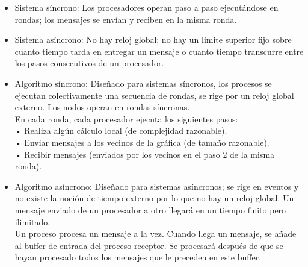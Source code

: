 \documentclass[12pt]{article}
\begin{document}
\begin{itemize}
    \item Sistema síncrono: Los procesadores operan paso a paso ejecutándose en rondas; los mensajes se envían y reciben en la misma ronda.
    \item Sistema asíncrono: No hay reloj global; no hay un limite superior fijo sobre cuanto tiempo tarda en entregar un mensaje o cuanto tiempo transcurre entre los pasos consecutivos de un procesador.
    \item Algoritmo síncrono: Diseñado para sistemas síncronos, los
            procesos se ejecutan colectivamente una secuencia de rondas, se rige por un reloj global externo.
            Los nodos operan en rondas síncronas. \\
            En cada ronda, cada procesador ejecuta los siguientes pasos:\\
            • Realiza algún cálculo local (de complejidad razonable).\\
            • Enviar mensajes a los vecinos de la gráfica (de tamaño razonable).\\
            • Recibir mensajes (enviados por los vecinos en el paso 2 de la misma ronda).
    \item Algoritmo asíncrono: Diseñado para sistemas asíncronos; se rige en eventos y no existe la noción de tiempo externo por lo que no hay un reloj global. Un mensaje enviado de un procesador a otro llegará en un tiempo finito pero ilimitado.\\
    Un proceso procesa un mensaje a la vez. Cuando llega un mensaje,
    se añade al buffer de entrada del proceso receptor. Se procesará después de que se hayan procesado todos los mensajes que le preceden en este buffer.
\end{itemize}
\end{document}
